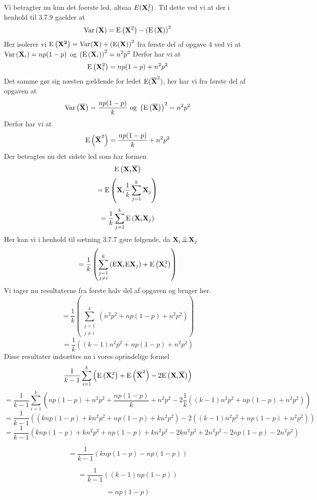 \documentclass[a4paper,11pt]{article}
\begin{document}
Vi betragter nu kun det foerste led, altsaa $E(\mathbf{X}_i^2)$. Til dette ved vi at der i henhold til 3.7.9 gaelder at
\[
\textrm{Var}\left(\mathbf{X}\right) = \textrm{E}\left( \mathbf{X}^2 \right) - \left( \textrm{E} \left( \mathbf{X} \right) \right)^2
\]
Her isolerer vi $\textrm{E}\left( \mathbf{X^2} \right) = \textrm{Var}(\mathbf{X}) + \left( \textrm{E} ( \mathbf{X} ) \right)^2$ fra f\o rste del af opgave 4 ved vi at $\textrm{Var}\left( \mathbf{X}_i \right) = np(1-p)$ og $\left(\textrm{E}\left(\mathbf{X}_i\right)\right)^2 = n^2p^2$
Derfor har vi at
\[
\textrm{E}\left( \mathbf{X}_{i}^{2} \right) = np(1-p) + n^2p^2
\]
Det samme g\o r sig n\ae sten g\ae ldende for ledet $\textrm{E}(\mathbf{\overline{X}}^{2} )$, her har vi fra f\o rste del af opgaven at
\[
\textrm{Var}\left(\mathbf{\overline{X}} \right) = \frac{np(1-p)}{k} \textrm{ og } \left(\textrm{E}\left(\mathbf{\overline{X}}\right)\right)^2 = n^2p^2
\]
Derfor har vi at
\[
\textrm{E}\left(\mathbf{\overline{X}}^{2} \right) = \frac{np(1-p)}{k} + n^2p^2
\]
Der betragtes nu det sidste led som har formen
\[
\textrm{E}\left( \mathbf{X}_i \mathbf{\overline{X}}\right)
\]
\[
= \textrm{E}\left( \mathbf{X}_i \frac{1}{k} \sum_{j = 1}^{k} \mathbf{X}_j \right)
\]
\[
= \frac{1}{k} \sum_{j = 1}^{k} \textrm{E}\left( \mathbf{X}_i \mathbf{X}_j \right)
\]
Her kan vi i henhold til s\ae tning 3.7.7 g\o re f\o lgende, da $\mathbf{X}_i {\;\bot\!\!\!\!\!\!\bot\;} \mathbf{X}_j$
\[
= \frac{1}{k} \left( \sum_{\substack{j = 1 \\ j \neq i}}^{k} \left( \textrm{E} \mathbf{X}_i \textrm{E} \mathbf{X}_j \right) + \textrm{E} \left( \mathbf{X}_{i}^{2} \right) \right)
\]
Vi tager nu resultaterne fra f\o rste halv del af opgaven og bruger her.
\[
= \frac{1}{k}\left( \sum_{\substack{j = 1 \\ j \neq i}}^{k} \left( n^2p^2 + np \left( 1 - p \right) + n^2p^2 \right) \right)
\]
\[
= \frac{1}{k} \left( \left(k-1 \right) n^2p^2 + np \left( 1 - p \right) + n^2p^2 \right)
\]
Disse resultater inds\ae ttes nu i vores oprindelige formel
\[
\frac{1}{k-1}\sum_{i=1}^{k}\left( \textrm{E}\left(\mathbf{X}_i^2\right) + \textrm{E}\left( \mathbf{\overline{X}}^2\right) - 2\textrm{E}\left(\mathbf{X}_i\mathbf{\overline{X}} \right) \right)
\]
\[
= \frac{1}{k-1}\sum_{i=1}^{k} \left( np(1-p)+n^2p^2 + \frac{np(1-p)}{k} + n^2p^2 - 2\frac{1}{k} \left( \left( k-1 \right) n^2p^2 + np \left( 1-p \right) + n^2p^2 \right) \right)
\]
\[
= \frac{1}{k-1} \left( \left( knp \left( 1-p \right) + kn^2p^2 + np(1-p) + kn^2p^2 \right) - 2 \left( \left( k-1 \right) n^2p^2 + np \left( 1-p \right) + n^2p^2\right) \right)
\]
\[
= \frac{1}{k-1} \left( knp \left( 1-p \right) + kn^2p^2  + np \left( 1-p \right) + kn^2p^2 - 2 kn^2p^2 +2n^2p^2 - 2np \left( 1-p \right)-2n^2p^2 \right)
\]

\[
= \frac{1}{k-1} \left( knp \left( 1-p \right) - np \left( 1-p \right) \right)
\]

\[
= \frac{1}{k-1} \left( \left( k-1 \right) np \left( 1-p \right) \right)
\]

\[
= np \left( 1-p \right)
\]
\end{document}
